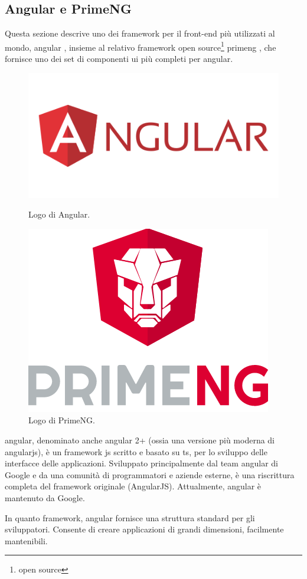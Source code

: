 \subsection{Angular e PrimeNG}\label{sec:ang+prime}
Questa sezione descrive uno dei \gls{framework} per il front-end più utilizzati al mondo, \gls{angular} \cite{angular}, insieme al relativo \gls{framework} \gls{open source}\footnote{\glsdesc{open source}} \acrshort{primeng} \cite{primeng}, che fornisce uno dei set di componenti \acrshort{ui} più completi per \gls{angular}.

\begin{figure}[!htb]
    \centering
    \begin{minipage}{.5\textwidth}
        \centering
        \includegraphics[width=.5\textwidth]{Images/angular.png}
        \centering
        \caption{\label{fig:ang logo}Logo di Angular.}
    \end{minipage}%
    \begin{minipage}{0.5\textwidth}
        \centering
        \includegraphics[width=.35\textwidth]{Images/primeng.png}
        \caption{\label{fig:ng logo}Logo di PrimeNG.}
    \end{minipage}
\end{figure}

\gls{angular}, denominato anche \gls{angular} 2+ (ossia una versione più moderna di \gls{angularjs}), è un \gls{framework} \acrlong{js} scritto e basato su \acrlong{ts}, per lo sviluppo delle interfacce delle applicazioni. Sviluppato principalmente dal team \gls{angular} di Google e da una comunità di programmatori e aziende esterne, è una riscrittura completa del \gls{framework} originale (AngularJS). Attualmente, \gls{angular} è mantenuto da Google.

In quanto \gls{framework}, \gls{angular} fornisce una struttura standard per gli sviluppatori. Consente di creare applicazioni di grandi dimensioni, facilmente mantenibili.  

